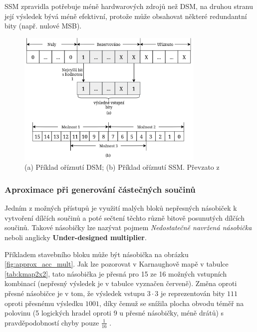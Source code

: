 SSM zpravidla potřebuje méně hardwarových zdrojů než DSM, na druhou stranu její výsledek bývá méně efektivní, protože může obsahovat některé redundantní bity (např. nulové MSB).

\begin{figure}[H]
    \centering
    \includegraphics[width=0.8\textwidth]{obrazky-figures/dsm_ssm.png}
    \caption{(a) Příklad oříznutí DSM; (b) Příklad oříznutí SSM. Převzato z \cite{approx_mult_survey}}
    \label{fig:dsm_ssm}
\end{figure}

\subsubsection{Aproximace při generování částečných součinů}
Jedním z možných přístupů je využití malých bloků nepřesných násobiček k vytvoření dílčích součinů a poté sečtení těchto různě bitově posunutých dílčích součinů. Takové násobičky lze nazývat pojmem \textit{Nedostatečně navržená násobička} neboli anglicky \textbf{Under-designed multiplier}. 

Příkladem stavebního bloku může být násobička na obrázku \ref{fig:approx_acc_mult}. Jak lze pozorovat v Karnaughově mapě v tabulce \ref{tab:kmap2x2}, tato násobička je přesná pro 15 ze 16 možných vstupních kombinací (nepřesný výsledek je v tabulce vyznačen červeně). Změna oproti přesné násobičce je v tom, že výsledek vstupu $3\cdot3$ je reprezentován bity $111$ oproti přesnému výsledku $1001$, díky čemuž se snížila plocha obvodu téměř na polovinu (5 logických hradel oproti 9 u přesné násobičky, méně drátů) s pravděpodobností chyby pouze $\frac{1}{16}$ \cite{underdesigned_mult}.

